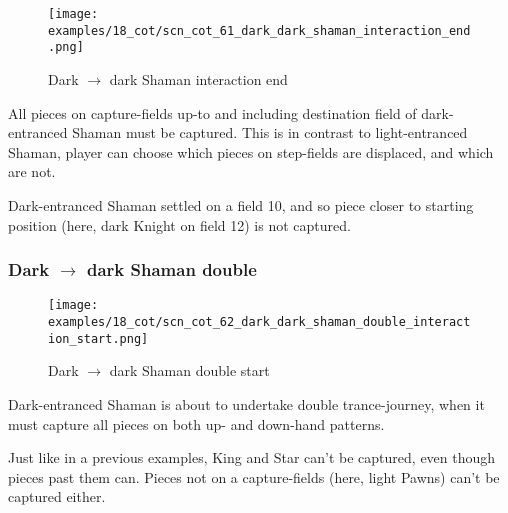 \clearpage %

\noindent
\begin{figure}[!h]
\texttt{[image: examples/18\_cot/scn\_cot\_61\_dark\_dark\_shaman\_interaction\_end.png]}
\caption{Dark $\rightarrow$ dark Shaman interaction end}
\label{fig:scn_cot_61_dark_dark_shaman_interaction_end}
\end{figure}

All pieces on capture-fields up-to and including destination field of dark-entranced
Shaman must be captured. This is in contrast to light-entranced Shaman, player can
choose which pieces on step-fields are displaced, and which are not.

Dark-entranced Shaman settled on a field 10, and so piece closer to starting position
(here, dark Knight on field 12) is not captured.

\clearpage %

\subsubsection*{Dark $\rightarrow$ dark Shaman double}
\label{sec:Conquest of Tlalocan/Trance-journey/Interactions/Dark --> dark Shaman double}

\vspace*{-1.4\baselineskip}
\noindent
\begin{figure}[!h]
\texttt{[image: examples/18\_cot/scn\_cot\_62\_dark\_dark\_shaman\_double\_interaction\_start.png]}
\caption{Dark $\rightarrow$ dark Shaman double start}
\label{fig:scn_cot_62_dark_dark_shaman_double_interaction_start}
\end{figure}

Dark-entranced Shaman is about to undertake double trance-journey, when it must
capture all pieces on both up- and down-hand patterns.

Just like in a previous examples, King and Star can't be captured, even though
pieces past them can. Pieces not on a capture-fields (here, light Pawns) can't
be captured either.

\clearpage %

